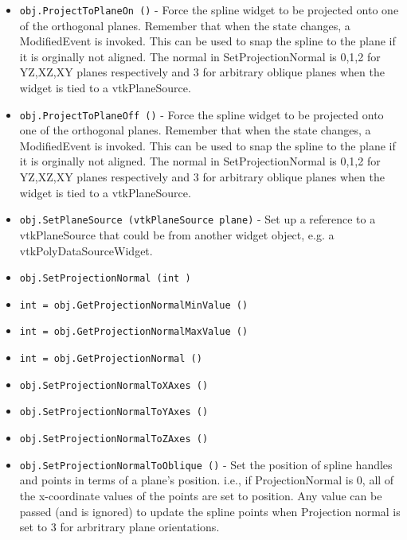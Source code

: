 \begin{itemize}
\item  \verb|obj.ProjectToPlaneOn ()| -  Force the spline widget to be projected onto one of the orthogonal planes.
 Remember that when the state changes, a ModifiedEvent is invoked.
 This can be used to snap the spline to the plane if it is orginally
 not aligned.  The normal in SetProjectionNormal is 0,1,2 for YZ,XZ,XY
 planes respectively and 3 for arbitrary oblique planes when the widget
 is tied to a vtkPlaneSource.

\item  \verb|obj.ProjectToPlaneOff ()| -  Force the spline widget to be projected onto one of the orthogonal planes.
 Remember that when the state changes, a ModifiedEvent is invoked.
 This can be used to snap the spline to the plane if it is orginally
 not aligned.  The normal in SetProjectionNormal is 0,1,2 for YZ,XZ,XY
 planes respectively and 3 for arbitrary oblique planes when the widget
 is tied to a vtkPlaneSource.

\item  \verb|obj.SetPlaneSource (vtkPlaneSource plane)| -  Set up a reference to a vtkPlaneSource that could be from another widget
 object, e.g. a vtkPolyDataSourceWidget.

\item  \verb|obj.SetProjectionNormal (int )|

\item  \verb|int = obj.GetProjectionNormalMinValue ()|

\item  \verb|int = obj.GetProjectionNormalMaxValue ()|

\item  \verb|int = obj.GetProjectionNormal ()|

\item  \verb|obj.SetProjectionNormalToXAxes ()|

\item  \verb|obj.SetProjectionNormalToYAxes ()|

\item  \verb|obj.SetProjectionNormalToZAxes ()|

\item  \verb|obj.SetProjectionNormalToOblique ()| -  Set the position of spline handles and points in terms of a plane's
 position. i.e., if ProjectionNormal is 0, all of the x-coordinate
 values of the points are set to position. Any value can be passed (and is
 ignored) to update the spline points when Projection normal is set to 3
 for arbritrary plane orientations.


\end{itemize}

